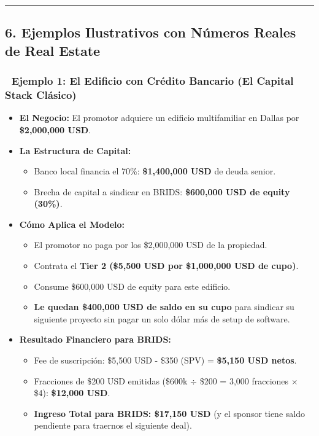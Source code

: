 \documentclass[
]{article}
\providecommand{\tightlist}{%
  \setlength{\itemsep}{0pt}\setlength{\parskip}{0pt}}
\begin{document}
\begin{center}\rule{0.5\linewidth}{0.5pt}\end{center}

\subsection{6. Ejemplos Ilustrativos con Números Reales de Real
Estate}\label{ejemplos-ilustrativos-con-nuxfameros-reales-de-real-estate}

\subsubsection{🏢 Ejemplo 1: El Edificio con Crédito Bancario (El
Capital Stack
Clásico)}\label{ejemplo-1-el-edificio-con-cruxe9dito-bancario-el-capital-stack-cluxe1sico}

\begin{itemize}
\tightlist
\item
  \textbf{El Negocio:} El promotor adquiere un edificio multifamiliar en
  Dallas por \textbf{\$2,000,000 USD}.
\item
  \textbf{La Estructura de Capital:}

  \begin{itemize}
  \tightlist
  \item
    Banco local financia el 70\%: \textbf{\$1,400,000 USD} de deuda
    senior.
  \item
    Brecha de capital a sindicar en BRIDS: \textbf{\$600,000 USD de
    equity (30\%)}.
  \end{itemize}
\item
  \textbf{Cómo Aplica el Modelo:}

  \begin{itemize}
  \tightlist
  \item
    El promotor no paga por los \$2,000,000 USD de la propiedad.
  \item
    Contrata el \textbf{Tier 2 (\$5,500 USD por \$1,000,000 USD de
    cupo)}.
  \item
    Consume \$600,000 USD de equity para este edificio.
  \item
    \textbf{Le quedan \$400,000 USD de saldo en su cupo} para sindicar
    su siguiente proyecto sin pagar un solo dólar más de setup de
    software.
  \end{itemize}
\item
  \textbf{Resultado Financiero para BRIDS:}

  \begin{itemize}
  \tightlist
  \item
    Fee de suscripción: \$5,500 USD - \$350 (SPV) = \textbf{\$5,150 USD
    netos}.
  \item
    Fracciones de \$200 USD emitidas (\$600k \(\div\) \$200 = 3,000
    fracciones \(\times\) \$4): \textbf{\$12,000 USD}.
  \item
    \textbf{Ingreso Total para BRIDS: \$17,150 USD} (y el sponsor tiene
    saldo pendiente para traernos el siguiente deal).
  \end{itemize}
\end{itemize}
\end{document}
